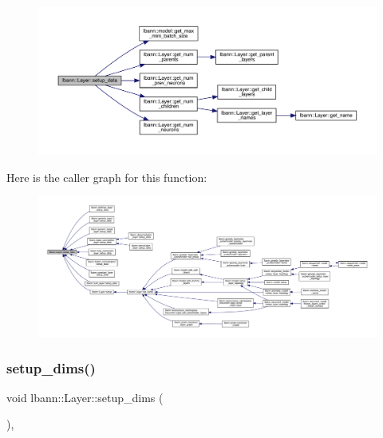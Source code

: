 \begin{figure}[H]
\begin{center}
\leavevmode
\includegraphics[width=350pt]{classlbann_1_1Layer_a50a89f8a68762c677d48efe384676e81_cgraph}
\end{center}
\end{figure}
Here is the caller graph for this function\+:\nopagebreak
\begin{figure}[H]
\begin{center}
\leavevmode
\includegraphics[width=350pt]{classlbann_1_1Layer_a50a89f8a68762c677d48efe384676e81_icgraph}
\end{center}
\end{figure}
\mbox{\label{classlbann_1_1Layer_a90fce1b06c1f2abb480e18cfe08a9746}} 
\subsubsection{\texorpdfstring{setup\+\_\+dims()}{setup\_dims()}}
{\footnotesize\ttfamily void lbann\+::\+Layer\+::setup\+\_\+dims (\begin{DoxyParamCaption}{ }\end{DoxyParamCaption})\hspace{0.3cm}{\ttfamily [protected]}, {\ttfamily [virtual]}}

